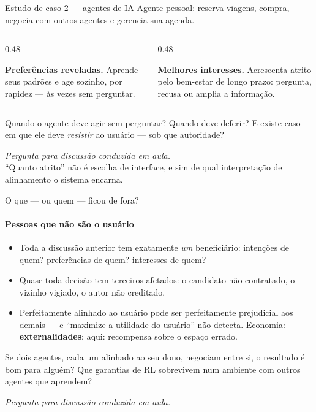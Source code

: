 \documentclass[aspectratio=169, 11pt]{beamer}
\newcommand{\paradiscussao}{\smallskip
  {\footnotesize\color{rlCinza}\itshape Pergunta para discussão conduzida em aula.}}
\begin{document}
\begin{frame}{Estudo de caso 2 --- agentes de IA}
  {\small Agente pessoal: reserva viagens, compra, negocia com outros agentes
  e gerencia sua agenda.}

  \begin{columns}[T]
    \begin{column}{0.48\textwidth}
      \begin{ideiabox}
        \textbf{Preferências reveladas.} Aprende seus padrões e age sozinho,
        por rapidez --- às vezes sem perguntar.
      \end{ideiabox}
    \end{column}
    \begin{column}{0.48\textwidth}
      \begin{alertabox}
        \textbf{Melhores interesses.} Acrescenta atrito pelo bem-estar de longo
        prazo: pergunta, recusa ou amplia a informação.
      \end{alertabox}
    \end{column}
  \end{columns}

  \vspace{-0.3em}
  \begin{quizbox}{}
    Quando o agente deve agir sem perguntar? Quando deve deferir? E existe
    caso em que ele deve \emph{resistir} ao usuário --- sob que autoridade?
  \end{quizbox}
  \paradiscussao\\[-0.2em]
  {\footnotesize\color{rlCinza} ``Quanto atrito'' não é escolha de interface, e
  sim de qual interpretação de alinhamento o sistema encarna.}
\end{frame}

\begin{frame}{O que --- ou quem --- ficou de fora?}
  \framesubtitle{Pessoas que não são o usuário}
  {\small
  \begin{itemize}\setlength{\itemsep}{0.25ex}
    \item Toda a discussão anterior tem exatamente \emph{um} beneficiário:
          intenções de quem? preferências de quem? interesses de quem?
    \item Quase toda decisão tem terceiros afetados: o candidato não
          contratado, o vizinho vigiado, o autor não creditado.
    \item Perfeitamente alinhado ao usuário pode ser \alert{perfeitamente
          prejudicial} aos demais --- e ``maximize a utilidade do usuário''
          não detecta. Economia: \textbf{externalidades}; aqui: recompensa
          sobre o espaço errado.
  \end{itemize}}

  \vspace{-0.5em}
  \begin{quizbox}{}
    Se dois agentes, cada um alinhado ao seu dono, negociam entre si, o
    resultado é bom para alguém? Que garantias de RL sobrevivem num ambiente
    com outros agentes que aprendem?
  \end{quizbox}
  \paradiscussao
\end{frame}
\end{document}
